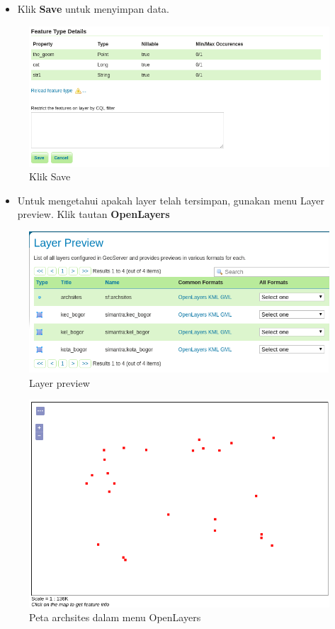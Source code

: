 \documentclass[]{book}
\providecommand{\tightlist}{%
  \setlength{\itemsep}{0pt}\setlength{\parskip}{0pt}}
\begin{document}
\begin{itemize}
\tightlist
\item
  Klik \textbf{Save} untuk menyimpan data.
\end{itemize}

\begin{figure}

{\centering \includegraphics[width=0.6\linewidth]{images/08/gs17c} 

}

\caption{Klik Save}\label{fig:gs17c}
\end{figure}

\begin{itemize}
\tightlist
\item
  Untuk mengetahui apakah layer telah tersimpan, gunakan menu Layer preview. Klik tautan \textbf{OpenLayers}
\end{itemize}

\begin{figure}

{\centering \includegraphics[width=0.6\linewidth]{images/08/gs18} 

}

\caption{Layer preview}\label{fig:gs18}
\end{figure}

\begin{figure}

{\centering \includegraphics[width=0.6\linewidth]{images/08/gs19} 

}

\caption{Peta archsites dalam menu OpenLayers}\label{fig:gs19}
\end{figure}
\end{document}
